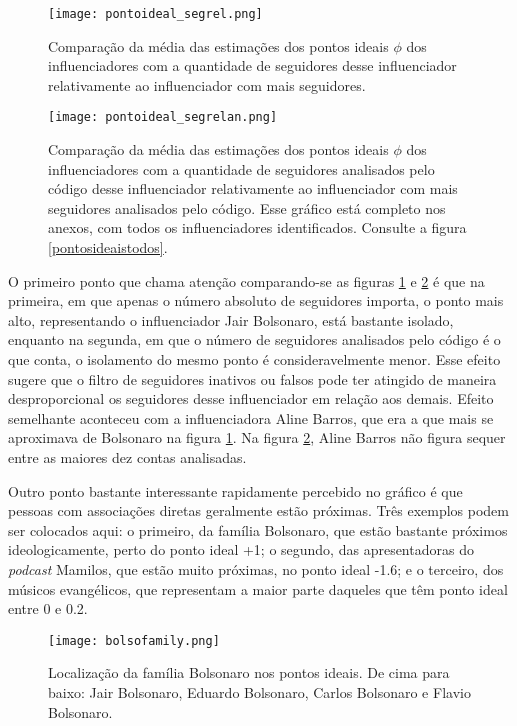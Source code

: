 \documentclass[
	12pt,				%
	openright,			%
	twoside,			%
	a4paper,			%
	english,			%
	brazil				%
	]{abntex2}
\begin{document}
 \begin{figure}[!htbp]
    \centering
    \texttt{[image: pontoideal\_segrel.png]}
    \caption{Comparação da média das estimações dos pontos ideais $\phi$ dos influenciadores com a quantidade de seguidores desse influenciador relativamente ao influenciador com mais seguidores.}
    \label{pontoidealsegrel}
 \end{figure}

 \begin{figure}[!htbp]
    \centering
    \texttt{[image: pontoideal\_segrelan.png]}
    \caption{Comparação da média das estimações dos pontos ideais $\phi$ dos influenciadores com a quantidade de seguidores analisados pelo código desse influenciador relativamente ao influenciador com mais seguidores analisados pelo código. Esse gráfico está completo nos anexos, com todos os influenciadores identificados. Consulte a figura \ref{pontosideaistodos}.}
    \label{pontoidealsegrelan}
 \end{figure}
 
 O primeiro ponto que chama atenção comparando-se as figuras \ref{pontoidealsegrel} e \ref{pontoidealsegrelan} é que na primeira, em que apenas o número absoluto de seguidores importa, o ponto mais alto, representando o influenciador Jair Bolsonaro, está bastante isolado, enquanto na segunda, em que o número de seguidores analisados pelo código é o que conta, o isolamento do mesmo ponto é consideravelmente menor. Esse efeito sugere que o filtro de seguidores inativos ou falsos pode ter atingido de maneira desproporcional os seguidores desse influenciador em relação aos demais. Efeito semelhante aconteceu com a influenciadora Aline Barros, que era a que mais se aproximava de Bolsonaro na figura \ref{pontoidealsegrel}. Na figura \ref{pontoidealsegrelan}, Aline Barros não figura sequer entre as maiores dez contas analisadas.
 
 Outro ponto bastante interessante rapidamente percebido no gráfico é que pessoas com associações diretas geralmente estão próximas. Três exemplos podem ser colocados aqui: o primeiro, da família Bolsonaro, que estão bastante próximos ideologicamente, perto do ponto ideal +1; o segundo, das apresentadoras do \textit{podcast} Mamilos, que estão muito próximas, no ponto ideal -1.6; e o terceiro, dos músicos evangélicos, que representam a maior parte daqueles que têm ponto ideal entre 0 e 0.2.

 \begin{figure}[!htbp]
    \centering
    \texttt{[image: bolsofamily.png]}
    \caption{Localização da família Bolsonaro nos pontos ideais. De cima para baixo: Jair Bolsonaro, Eduardo Bolsonaro, Carlos Bolsonaro e Flavio Bolsonaro.}
    \label{bolsofamily}
 \end{figure}
\end{document}
